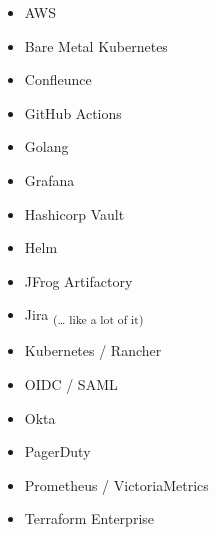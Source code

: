 \documentclass[10pt,letterpaper]{article}
\begin{document}
{{{\begin{multicols}{3}
        \begin{itemize}[left=0pt, labelsep=0.5em, itemindent=0pt, listparindent=\parindent, nosep]
          \item AWS
          \item Bare Metal Kubernetes
          \item Confleunce
          \item GitHub Actions
          \item Golang
          \item Grafana
          \item Hashicorp Vault
          \item Helm
          \item JFrog Artifactory
          \item Jira \textsubscript{(… like a lot of it)}
          \item Kubernetes / Rancher
          \item OIDC / SAML
          \item Okta
          \item PagerDuty
          \item Prometheus / \mbox{VictoriaMetrics}
          \item Terraform Enterprise
        \end{itemize}
      \end{multicols}
    }
  }
}
\end{document}
